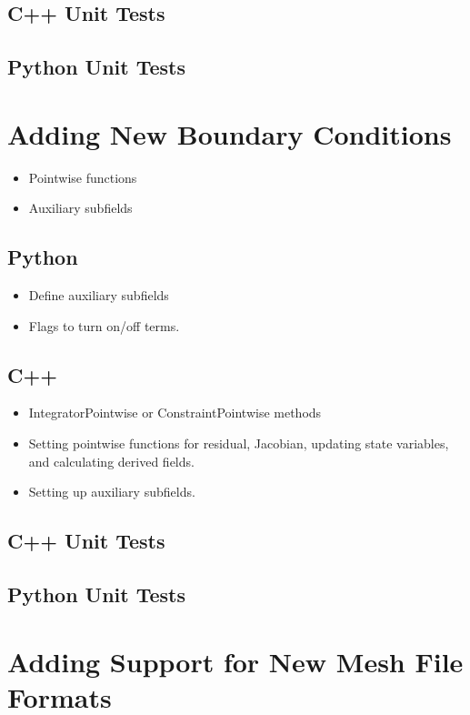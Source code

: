 \subsection{C++ Unit Tests}

\subsection{Python Unit Tests}

\section{Adding New Boundary Conditions}


\begin{itemize}
\item Pointwise functions
\item Auxiliary subfields
\end{itemize}

\subsection{Python}

\begin{itemize}
\item Define auxiliary subfields
\item Flags to turn on/off terms.
\end{itemize}

\subsection{C++}

\begin{itemize}
\item IntegratorPointwise or ConstraintPointwise methods
\item Setting pointwise functions for residual, Jacobian, updating
  state variables, and calculating derived fields.
\item Setting up auxiliary subfields.
\end{itemize}

\subsection{C++ Unit Tests}

\subsection{Python Unit Tests}


\section{Adding Support for New Mesh File Formats}

